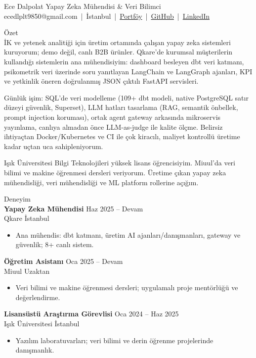 \documentclass[11pt,a4paper]{article}
\newcommand{\cvsection}[1]{%
  \vspace{0.7em}%
  {\normalsize\fontseries{m}\selectfont #1}\\[0.25em]
}
\newcommand{\jobentry}[4]{%
  \textbf{#1} \hfill {\small #2}\\
  {\small #3} \hfill {\small #4}\\[0.2em]
}
\begin{document}
{\LARGE Ece Dalpolat} \hfill Yapay Zeka Mühendisi \& Veri Bilimci\\[0.35em]
{\small
ecedlplt9850@gmail.com \,|\, İstanbul \,|\,
\href{https://ecedalpolat.github.io/ece-dalpolat-portfolio/}{Portföy} \,|\,
\href{https://github.com/EceDalpolat}{GitHub} \,|\,
\href{https://www.linkedin.com/in/ece-dalpolat-0265a0221/}{LinkedIn}
}

\cvsection{Özet}

İK ve yetenek analitiği için üretim ortamında çalışan yapay zeka sistemleri kuruyorum; demo değil, canlı B2B ürünler. Qkare'de kurumsal müşterilerin kullandığı sistemlerin ana mühendisiyim: dashboard besleyen dbt veri katmanı, psikometrik veri üzerinde soru yanıtlayan LangChain ve LangGraph ajanları, KPI ve yetkinlik öneren doğrulanmış JSON çıktılı FastAPI servisleri.

Günlük işim: SQL'de veri modelleme (109+ dbt modeli, native PostgreSQL satır düzeyi güvenlik, Superset), LLM hatları tasarlama (RAG, semantik önbellek, prompt injection koruması), ortak agent gateway arkasında mikroservis yayınlama, canlıya almadan önce LLM-as-judge ile kalite ölçme. Belirsiz ihtiyaçtan Docker/Kubernetes ve CI ile çok kiracılı, maliyet kontrollü üretime kadar uçtan uca sahipleniyorum.

Işık Üniversitesi Bilgi Teknolojileri yüksek lisans öğrencisiyim. Miuul'da veri bilimi ve makine öğrenmesi dersleri veriyorum. Üretime çıkan yapay zeka mühendisliği, veri mühendisliği ve ML platform rollerine açığım.

\cvsection{Deneyim}

\jobentry{Yapay Zeka Mühendisi}{Haz 2025 -- Devam}{Qkare}{İstanbul}
\begin{itemize}[leftmargin=1.2em, nosep, topsep=2pt]
  \item Ana mühendis: dbt katmanı, üretim AI ajanları/danışmanları, gateway ve güvenlik; 8+ canlı sistem.
\end{itemize}

\jobentry{Öğretim Asistanı}{Oca 2025 -- Devam}{Miuul}{Uzaktan}
\begin{itemize}[leftmargin=1.2em, nosep, topsep=2pt]
  \item Veri bilimi ve makine öğrenmesi dersleri; uygulamalı proje mentörlüğü ve değerlendirme.
\end{itemize}

\jobentry{Lisansüstü Araştırma Görevlisi}{Oca 2024 -- Haz 2025}{Işık Üniversitesi}{İstanbul}
\begin{itemize}[leftmargin=1.2em, nosep, topsep=2pt]
  \item Yazılım laboratuvarları; veri bilimi ve derin öğrenme projelerinde danışmanlık.
\end{itemize}
\end{document}
